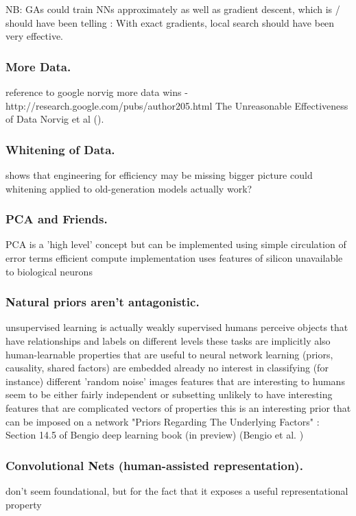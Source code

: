 \documentclass[citeauthoryear]{llncs}
\begin{document}
NB: GAs could train NNs approximately as well as gradient descent, which 
is / should have been telling : With exact gradients, local search should have 
been very effective.


\subsubsection*{More Data.}
  reference to google norvig more data wins - http://research.google.com/pubs/author205.html
    The Unreasonable Effectiveness of Data  Norvig et al (\cite{norvig-UnreasonableEffectivenessOfData}).
    


\subsubsection*{Whitening of Data.}
    shows that engineering for efficiency may be missing bigger picture
    could whitening applied to old-generation models actually work?


\subsubsection*{PCA and Friends.}
PCA is a 'high level' concept
  but can be implemented using simple circulation of error terms
  efficient compute implementation uses features of silicon unavailable to biological neurons

\subsubsection*{Natural priors aren't antagonistic.}
unsupervised learning is actually weakly supervised 
  humans perceive objects that have relationships and labels on different levels
    these tasks are implicitly also human-learnable
    properties that are useful to neural network learning (priors, causality, shared factors) are embedded already
  no interest in classifying (for instance) different 'random noise' images
  features that are interesting to humans seem to be either fairly independent or subsetting
    unlikely to have interesting features that are complicated vectors of properties
    this is an interesting prior that can be imposed on a network
      "Priors Regarding The Underlying Factors" : Section 14.5 of Bengio deep learning book (in preview) 
        (Bengio et al. \cite{Bengio-et-al-2014-Book}) 

\subsubsection*{Convolutional Nets (human-assisted representation).}
don't seem foundational, but for the fact that it exposes a useful representational property
\end{document}
